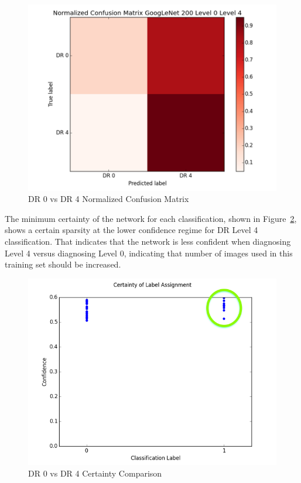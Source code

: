 \documentclass[letterpaper,12pt]{article}
\newcommand{\figref}[1]{Figure~\ref{#1}}
\begin{document}
\begin{figure}[htbp]
\begin{center}
\includegraphics[scale=0.5]{images/Normalized_DR0_DR4.png}
\caption{DR 0 vs DR 4 Normalized Confusion Matrix}
\label{DR0_DR4}
\end{center}
\end{figure}

The minimum certainty of the network for each classification, shown in \figref{C_DR0_DR4}, shows a certain sparsity at the lower confidence regime for DR Level 4 classification. That indicates that the network is less confident when diagnosing Level 4 versus diagnosing Level 0, indicating that number of images used in this training set should be increased.

\begin{figure}[htbp]
\begin{center}
\includegraphics[scale=0.5]{images/Certainty_DR0_DR4.png}
\caption{DR 0 vs DR 4 Certainty Comparison}
\label{C_DR0_DR4}
\end{center}
\end{figure}
\end{document}
